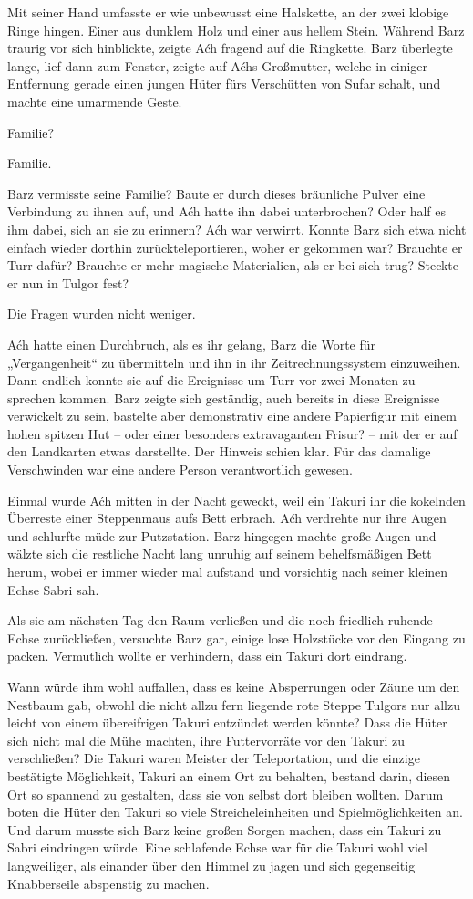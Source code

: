 Mit seiner Hand umfasste er wie unbewusst eine Halskette, an der zwei klobige Ringe hingen. Einer aus dunklem Holz und einer aus hellem Stein. Während Barz traurig vor sich hinblickte, zeigte Aćh fragend auf die Ringkette. Barz überlegte lange, lief dann zum Fenster, zeigte auf Aćhs Großmutter, welche in einiger Entfernung gerade einen jungen Hüter fürs Verschütten von Sufar schalt, und machte eine umarmende Geste.

Familie?

Familie.

Barz vermisste seine Familie? Baute er durch dieses bräunliche Pulver eine Verbindung zu ihnen auf, und Aćh hatte ihn dabei unterbrochen? Oder half es ihm dabei, sich an sie zu erinnern? Aćh war verwirrt. Konnte Barz sich etwa nicht einfach wieder dorthin zurückteleportieren, woher er gekommen war? Brauchte er Turr dafür? Brauchte er mehr magische Materialien, als er bei sich trug? Steckte er nun in Tulgor fest?

Die Fragen wurden nicht weniger.

Aćh hatte einen Durchbruch, als es ihr gelang, Barz die Worte für „Vergangenheit“ zu übermitteln und ihn in ihr Zeitrechnungssystem einzuweihen. Dann endlich konnte sie auf die Ereignisse um Turr vor zwei Monaten zu sprechen kommen. Barz zeigte sich geständig, auch bereits in diese Ereignisse verwickelt zu sein, bastelte aber demonstrativ eine andere Papierfigur mit einem hohen spitzen Hut – oder einer besonders extravaganten Frisur? – mit der er auf den Landkarten etwas darstellte. Der Hinweis schien klar. Für das damalige Verschwinden war eine andere Person verantwortlich gewesen.

Einmal wurde Aćh mitten in der Nacht geweckt, weil ein Takuri ihr die kokelnden Überreste einer Steppenmaus aufs Bett erbrach. Aćh verdrehte nur ihre Augen und schlurfte müde zur Putzstation. Barz hingegen machte große Augen und wälzte sich die restliche Nacht lang unruhig auf seinem behelfsmäßigen Bett herum, wobei er immer wieder mal aufstand und vorsichtig nach seiner kleinen Echse Sabri sah.

Als sie am nächsten Tag den Raum verließen und die noch friedlich ruhende Echse zurückließen, versuchte Barz gar, einige lose Holzstücke vor den Eingang zu packen. Vermutlich wollte er verhindern, dass ein Takuri dort eindrang.

Wann würde ihm wohl auffallen, dass es keine Absperrungen oder Zäune um den Nestbaum gab, obwohl die nicht allzu fern liegende rote Steppe Tulgors nur allzu leicht von einem übereifrigen Takuri entzündet werden könnte? Dass die Hüter sich nicht mal die Mühe machten, ihre Futtervorräte vor den Takuri zu verschließen? Die Takuri waren Meister der Teleportation, und die einzige bestätigte Möglichkeit, Takuri an einem Ort zu behalten, bestand darin, diesen Ort so spannend zu gestalten, dass sie von selbst dort bleiben wollten. Darum boten die Hüter den Takuri so viele Streicheleinheiten und Spielmöglichkeiten an. Und darum musste sich Barz keine großen Sorgen machen, dass ein Takuri zu Sabri eindringen würde. Eine schlafende Echse war für die Takuri wohl viel langweiliger, als einander über den Himmel zu jagen und sich gegenseitig Knabberseile abspenstig zu machen.

